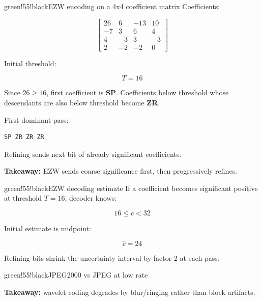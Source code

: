 \begin{calloutbox}{green!55!black}{EZW encoding on a 4x4 coefficient matrix}
Coefficients:

\[
\begin{bmatrix}
26 & 6 & -13 & 10\\
-7 & 3 & 6 & 4\\
4 & -3 & 3 & -3\\
2 & -2 & -2 & 0
\end{bmatrix}
\]

Initial threshold:

\[
T=16
\]

Since $26\geq16$, first coefficient is \textbf{SP}. Coefficients below threshold whose descendants are also below threshold become \textbf{ZR}.

First dominant pass:

\begin{verbatim}
SP ZR ZR ZR
\end{verbatim}

Refining sends next bit of already significant coefficients.

\textbf{Takeaway:} EZW sends coarse significance first, then progressively refines.
\end{calloutbox}

\begin{calloutbox}{green!55!black}{EZW decoding estimate}
If a coefficient becomes significant positive at threshold $T=16$, decoder knows:

\[
16\leq c<32
\]

Initial estimate is midpoint:

\[
\hat{c}=24
\]

Refining bits shrink the uncertainty interval by factor 2 at each pass.
\end{calloutbox}

\begin{calloutbox}{green!55!black}{JPEG2000 vs JPEG at low rate}
\begin{center}
\end{center}

\textbf{Takeaway:} wavelet coding degrades by blur/ringing rather than block artifacts.
\end{calloutbox}

